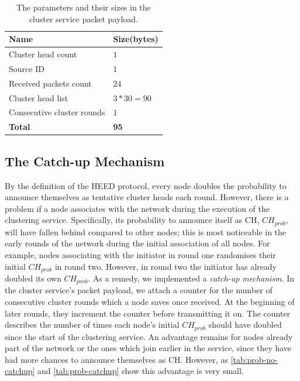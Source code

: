 \begin{table}[bt]
\centering
\caption{The parameters and their sizes in the cluster service packet payload.}
\label{table:cluster-service-packet}
\begin{tabular}{|l|l|}
\hline
\textbf{Name}               & \textbf{Size(bytes)} \\ \hline
Cluster head count          & $1$                    \\
Source ID                   & $1$                    \\
Received packets count      & $24$                    \\
Cluster head list           & $3*30=90$              \\
Consecutive cluster rounds  & $1$                    \\ \hline
\textbf{Total}              & \textbf{95}          \\ \hline
\end{tabular}
\end{table}

\subsection{The Catch-up Mechanism}
\label{subsec:catch-up-mechanism}
By the definition of the HEED protocol, every node doubles the probability to announce themselves as tentative cluster heads each round. However, there is a problem if a node associates with the network during the execution of the clustering service. Specifically, its probability to announce itself as CH, $CH_{prob}$, will have fallen behind compared to other nodes; this is most noticeable in the early rounds of the network during the initial association of all nodes. For example, nodes associating with the initiator in round one randomises their initial $CH_{prob}$ in round two. However, in round two the initiator has already doubled its own $CH_{prob}$. As a remedy, we implemented a \textit{catch-up mechanism}. In the cluster service's packet payload, we attach a counter for the number of consecutive cluster rounds which a node saves once received. At the beginning of later rounds, they increment the counter before transmitting it on. The counter describes the number of times each node's initial $CH_{prob}$ should have doubled since the start of the clustering service. An advantage remains for nodes already part of the network or the ones which join earlier in the service, since they have had more chances to announce themselves as CH. However, as \cref{tab:prob-no-catchup} and \cref{tab:prob-catchup} show this advantage is very small.

